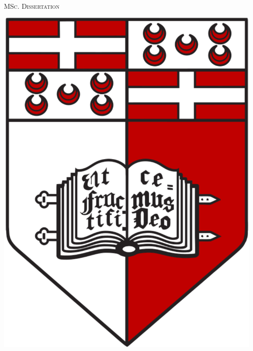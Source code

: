 \pagestyle{empty}

\begin{center}

{\huge \bfseries \ThesisTitle\par}
 
\vspace{20mm}

 {\textit \ThesisAuthor}\\
 
\vspace{20mm}

\textsc{MSc. Dissertation}

\vspace{20mm}

\includegraphics[scale=0.15]{img/logo-uom.pdf}


\end{center}
